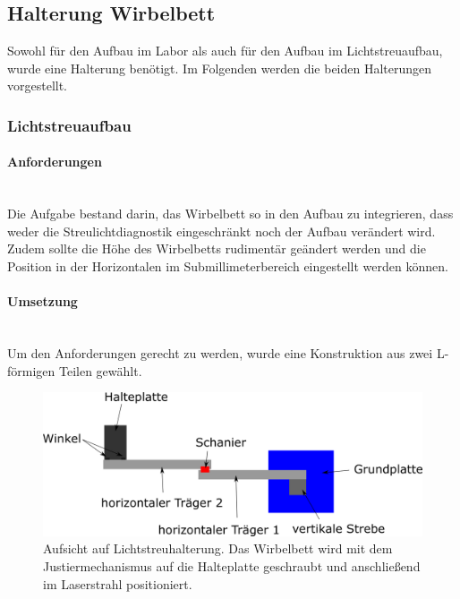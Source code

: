 \newpage

\subsection{Halterung Wirbelbett}

Sowohl für den Aufbau im Labor als auch für den Aufbau im Lichtstreuaufbau, wurde eine Halterung benötigt. Im Folgenden werden die beiden Halterungen vorgestellt.

\subsubsection{Lichtstreuaufbau}


\paragraph{Anforderungen}

\hfill \\
Die Aufgabe bestand darin, das Wirbelbett so in den Aufbau zu integrieren, dass weder die Streulichtdiagnostik eingeschränkt noch der Aufbau verändert wird. Zudem sollte die Höhe des Wirbelbetts rudimentär geändert werden und die Position in der Horizontalen im Submillimeterbereich eingestellt werden können. 


\paragraph{Umsetzung}
\hfill \\
Um den Anforderungen gerecht zu werden, wurde eine Konstruktion aus zwei L-förmigen Teilen gewählt. 

\begin{figure}[h!]
		\centering
		\includegraphics[scale=1.1]{Halterung_Lichtstreu_Vogel.png}
		\caption[Haltearm Lichtstreuaufbau Aufsicht]{Aufsicht auf Lichtstreuhalterung. Das Wirbelbett wird mit dem Justiermechanismus auf die Halteplatte geschraubt und anschließend im Laserstrahl positioniert.}
\end{figure}

